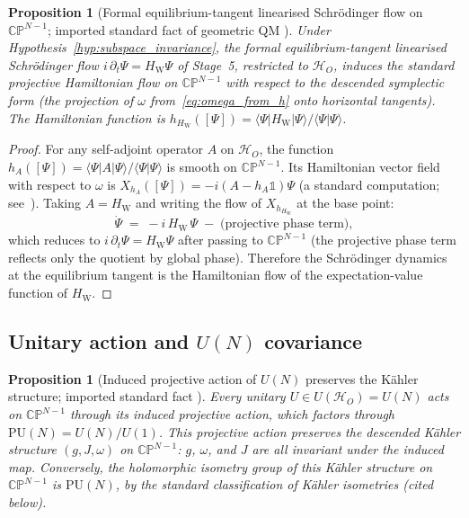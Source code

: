 \documentclass[12pt]{article}
\newtheorem{proposition}[theorem]{Proposition}
\newcommand{\HW}{H_{\mathrm{W}}}
\begin{document}
\begin{proposition}[Formal equilibrium-tangent linearised Schr\"odinger flow on $\mathbb{CP}^{N-1}$; imported standard fact of geometric QM \citep{AshtekarSchilling1999}]\label{prop:schroedinger_hamiltonian}
Under Hypothesis~\ref{hyp:subspace_invariance}, the formal equilibrium-tangent linearised Schr\"odinger flow $i\,\partial_t\Psi = \HW\Psi$ of Stage~5, restricted to $\mathcal{H}_O$, induces the standard projective Hamiltonian flow on $\mathbb{CP}^{N-1}$ with respect to the descended symplectic form (the projection of $\omega$ from~\eqref{eq:omega_from_h} onto horizontal tangents). The Hamiltonian function is $h_{\HW}([\Psi]) = \langle\Psi|\HW|\Psi\rangle/\langle\Psi|\Psi\rangle$.
\end{proposition}

\begin{proof}
For any self-adjoint operator $A$ on $\mathcal{H}_O$, the function $h_A([\Psi]) = \langle\Psi|A|\Psi\rangle/\langle\Psi|\Psi\rangle$ is smooth on $\mathbb{CP}^{N-1}$. Its Hamiltonian vector field with respect to $\omega$ is $X_{h_A}([\Psi]) = -i(A - h_A \mathbb{1})\Psi$ (a standard computation; see~\citep{AshtekarSchilling1999}). Taking $A = \HW$ and writing the flow of $X_{h_{\HW}}$ at the base point:
\begin{equation}
    \dot\Psi \;=\; -i\,\HW\,\Psi \;-\; \text{(projective phase term)},
\end{equation}
which reduces to $i\,\partial_t\Psi = \HW\Psi$ after passing to $\mathbb{CP}^{N-1}$ (the projective phase term reflects only the quotient by global phase). Therefore the Schr\"odinger dynamics at the equilibrium tangent is the Hamiltonian flow of the expectation-value function of $\HW$.
\end{proof}

\subsection{Unitary action and $U(N)$ covariance}\label{subsec:unitary}

\begin{proposition}[Induced projective action of $U(N)$ preserves the K\"ahler structure; imported standard fact \citep{KobayashiNomizu1969}]\label{prop:unitary}
Every unitary $U \in U(\mathcal{H}_O) = U(N)$ acts on $\mathbb{CP}^{N-1}$ through its induced projective action, which factors through $\mathrm{PU}(N) = U(N)/U(1)$. This projective action preserves the descended K\"ahler structure $(g, J, \omega)$ on $\mathbb{CP}^{N-1}$: $g$, $\omega$, and $J$ are all invariant under the induced map. Conversely, the holomorphic isometry group of this K\"ahler structure on $\mathbb{CP}^{N-1}$ is $\mathrm{PU}(N)$, by the standard classification of K\"ahler isometries (cited below).
\end{proposition}
\end{document}
